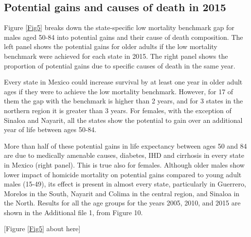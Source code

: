 \documentclass{bmcart}
\begin{document}
\subsection*{Potential gains and causes of death in 2015}

Figure \ref{Fig5} breaks down the state-specific low mortality benchmark gap for males aged 50-84 into potential gains and their cause of death composition. The left panel shows the potential gains for older adults if the low mortality benchmark were achieved for each state in 2015. The right panel shows the proportion of potential gains due to specific causes of death in the same year.

Every state in Mexico could increase survival by at least one year in older adult ages if they were to achieve the low mortality benchmark. However, for 17 of them the gap with the benchmark is higher than 2 years, and for 3 states in the northern region it is greater than 3 years. For females, with the exception of Sinaloa and Nayarit, all the states show the potential to gain over an additional year of life between ages 50-84.

More than half of these potential gains in life expectancy between ages 50 and 84 are due to medically amenable causes, diabetes, IHD and cirrhosis in every state in Mexico (right panel). This is true also for females. Although older males show lower impact of homicide mortality on potential gains compared to young adult males (15-49), its effect is present in almost every state, particularly in Guerrero, Morelos in the South, Nayarit and Colima in the central region, and Sinaloa in the North. Results for all the age groups for the years 2005, 2010, and 2015 are shown in the Additional file 1, from Figure 10. \\

\begin{center}
[Figure \ref{Fig5} about here]
\end{center}
\end{document}
